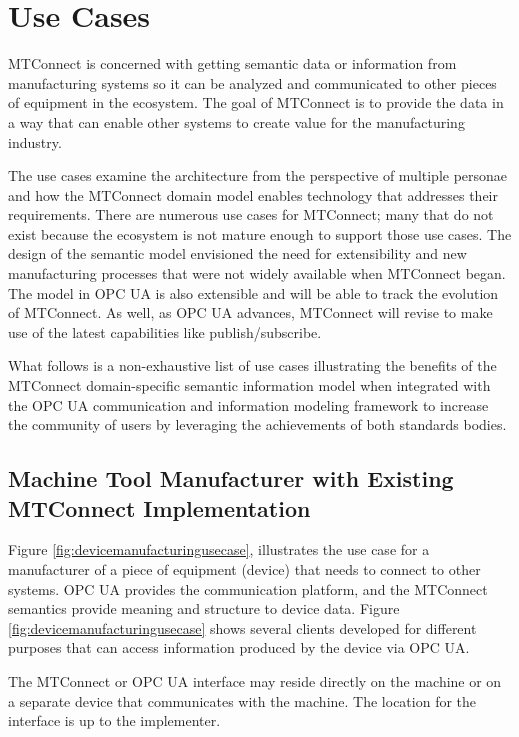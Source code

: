 \section{Use Cases}

MTConnect is concerned with getting semantic data or information from manufacturing systems so it can be analyzed and communicated to other pieces of equipment in the ecosystem. The goal of MTConnect is to provide the data in a way that can enable other systems to create value for the manufacturing industry. 

The use cases examine the architecture from the perspective of multiple personae and how the MTConnect domain model enables technology that addresses their requirements. There are numerous use cases for MTConnect; many that do not exist because the ecosystem is not mature enough to support those use cases. The design of the semantic model envisioned the need for extensibility and new manufacturing processes that were not widely available when MTConnect began. The model in OPC UA is also extensible and will be able to track the evolution of MTConnect. As well, as OPC UA advances, MTConnect will revise to make use of the latest capabilities like publish/subscribe.

What follows is a non-exhaustive list of use cases illustrating the benefits of the MTConnect domain-specific semantic information model when integrated with the OPC UA communication and information modeling framework to increase the community of users by leveraging the achievements of both standards bodies.

\subsection{Machine Tool Manufacturer with Existing MTConnect Implementation}

Figure \ref{fig:devicemanufacturingusecase}, illustrates the use case for a manufacturer of a piece of equipment (device) that needs to connect to other systems. OPC UA provides the communication platform, and the MTConnect semantics provide meaning and structure to device data. Figure \ref{fig:devicemanufacturingusecase} shows several clients developed for different purposes that can access information produced by the device via OPC UA.



The MTConnect or OPC UA interface may reside directly on the machine or on a separate device that communicates with the machine. The location for the interface is up to the implementer.

